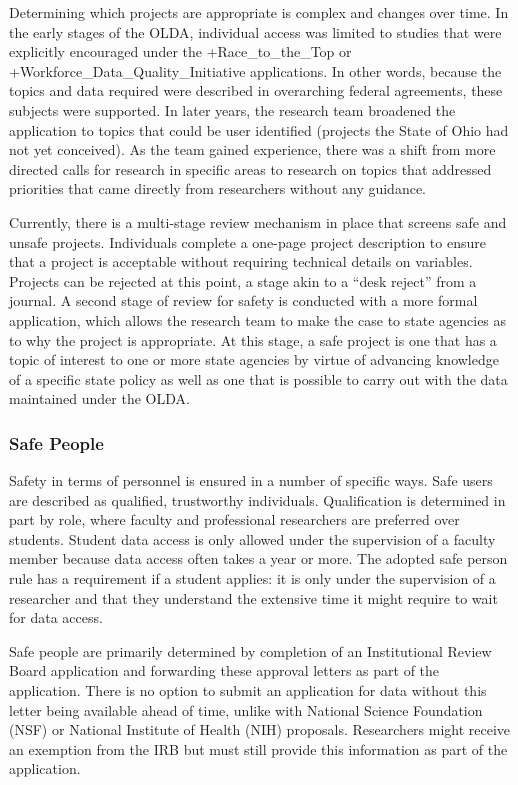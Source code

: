 \documentclass[
]{WileySix}
\begin{document}
Determining which projects are appropriate is complex and changes over time. In the early stages of the OLDA, individual access was limited to studies that were explicitly encouraged under the +Race\_to\_the\_Top\textbar{} or +Workforce\_Data\_Quality\_Initiative\textbar{} applications. In other words, because the topics and data required were described in overarching federal agreements, these subjects were supported. In later years, the research team broadened the application to topics that could be user identified (projects the State of Ohio had not yet conceived). As the team gained experience, there was a shift from more directed calls for research in specific areas to research on topics that addressed priorities that came directly from researchers without any guidance.

Currently, there is a multi-stage review mechanism in place that screens safe and unsafe projects. Individuals complete a one-page project description to ensure that a project is acceptable without requiring technical details on variables. Projects can be rejected at this point, a stage akin to a ``desk reject'' from a journal. A second stage of review for safety is conducted with a more formal application, which allows the research team to make the case to state agencies as to why the project is appropriate. At this stage, a safe project is one that has a topic of interest to one or more state agencies by virtue of advancing knowledge of a specific state policy as well as one that is possible to carry out with the data maintained under the OLDA.

\hypertarget{safe-people-1}{%
\subsubsection{Safe People}\label{safe-people-1}}

Safety in terms of personnel is ensured in a number of specific ways. Safe users are described as qualified, trustworthy individuals. Qualification is determined in part by role, where faculty and professional researchers are preferred over students. Student data access is only allowed under the supervision of a faculty member because data access often takes a year or more. The adopted safe person rule has a requirement if a student applies: it is only under the supervision of a researcher and that they understand the extensive time it might require to wait for data access.

Safe people are primarily determined by completion of an Institutional Review Board application and forwarding these approval letters as part of the application. There is no option to submit an application for data without this letter being available ahead of time, unlike with National Science Foundation (NSF) or National Institute of Health (NIH) proposals. Researchers might receive an exemption from the IRB but must still provide this information as part of the application.
\end{document}
